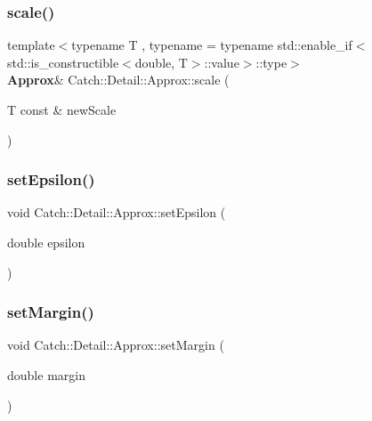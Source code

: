 \subsubsection{scale()}
{\footnotesize\ttfamily template$<$typename T , typename  = typename std\+::enable\+\_\+if$<$std\+::is\+\_\+constructible$<$double, T$>$\+::value$>$\+::type$>$ \\
\textbf{ Approx}\& Catch\+::\+Detail\+::\+Approx\+::scale (\begin{DoxyParamCaption}\item[{T const \&}]{new\+Scale }\end{DoxyParamCaption})\hspace{0.3cm}{\ttfamily [inline]}}

\mbox{\label{class_catch_1_1_detail_1_1_approx_a28fd65e069b698bc7ae8f060bfbcd6b6}} 
\subsubsection{setEpsilon()}
{\footnotesize\ttfamily void Catch\+::\+Detail\+::\+Approx\+::set\+Epsilon (\begin{DoxyParamCaption}\item[{double}]{epsilon }\end{DoxyParamCaption})\hspace{0.3cm}{\ttfamily [private]}}

\mbox{\label{class_catch_1_1_detail_1_1_approx_aff04b8b32edc707138eb395ed45ec576}} 
\subsubsection{setMargin()}
{\footnotesize\ttfamily void Catch\+::\+Detail\+::\+Approx\+::set\+Margin (\begin{DoxyParamCaption}\item[{double}]{margin }\end{DoxyParamCaption})\hspace{0.3cm}{\ttfamily [private]}}

\mbox{\label{class_catch_1_1_detail_1_1_approx_a972fd9ac60607483263f1b0f0f9955e6}} 
